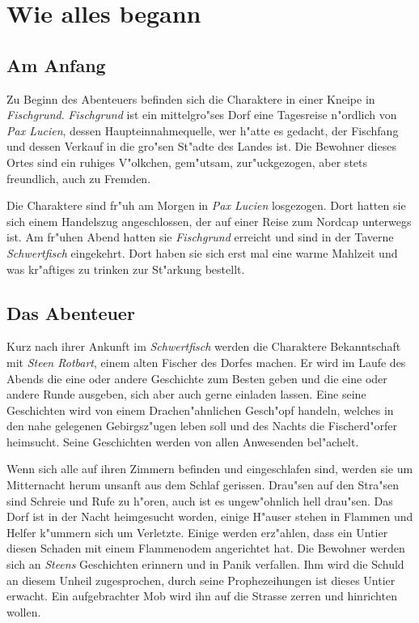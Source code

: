 \chapter{Wie alles begann}

\section{Am Anfang}
\par Zu Beginn des Abenteuers befinden sich die Charaktere in einer Kneipe in \textit{Fischgrund}. \textit{Fischgrund} ist ein mittelgro"ses Dorf eine Tagesreise n"ordlich von \textit{Pax Lucien}, dessen Haupteinnahmequelle, wer h"atte es gedacht, der Fischfang und dessen Verkauf in die gro"sen St"adte des Landes ist. Die Bewohner dieses Ortes sind ein ruhiges V"olkchen, gem"utsam, zur"uckgezogen, aber stets freundlich, auch zu Fremden.
\par Die Charaktere sind fr"uh am Morgen in \textit{Pax Lucien} losgezogen. Dort hatten sie sich einem Handelszug angeschlossen, der auf einer Reise zum Nordcap unterwegs ist. Am fr"uhen Abend hatten sie \textit{Fischgrund} erreicht und sind in der Taverne \textit{Schwertfisch} eingekehrt. Dort haben sie sich erst mal eine warme Mahlzeit und was kr"aftiges zu trinken zur St"arkung bestellt.

\section{Das Abenteuer}
\par Kurz nach ihrer Ankunft im \textit{Schwertfisch} werden die Charaktere Bekanntschaft mit \textit{Steen Rotbart}, einem alten Fischer des Dorfes machen. Er wird im Laufe des Abends die eine oder andere Geschichte zum Besten geben und die eine oder andere Runde ausgeben, sich aber auch gerne einladen lassen. Eine seine Geschichten wird von einem Drachen"ahnlichen Gesch"opf handeln, welches in den nahe gelegenen Gebirgsz"ugen leben soll und des Nachts die Fischerd"orfer heimsucht. Seine Geschichten werden von allen Anwesenden bel"achelt.

\par Wenn sich alle auf ihren Zimmern befinden und eingeschlafen sind, werden sie um Mitternacht herum unsanft aus dem Schlaf gerissen. Drau"sen auf den Stra"sen sind Schreie und Rufe zu h"oren, auch ist es ungew"ohnlich hell drau"sen. Das Dorf ist in der Nacht heimgesucht worden, einige H"auser stehen in Flammen und Helfer k"ummern sich um Verletzte. Einige werden erz"ahlen, dass ein Untier diesen Schaden mit einem Flammenodem angerichtet hat. Die Bewohner werden sich an \textit{Steens} Geschichten erinnern und in Panik verfallen. Ihm wird die Schuld an diesem Unheil zugesprochen, durch seine Prophezeihungen ist dieses Untier erwacht. Ein aufgebrachter Mob wird ihn auf die Strasse zerren und hinrichten wollen.

